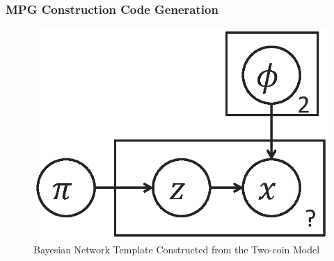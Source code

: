 \subsubsection{MPG Construction Code Generation}
\begin{figure}[h]
\centering
\includegraphics[scale=0.4]{figs/two_coins_bn1.eps}
\caption{Bayesian Network Template Constructed from the Two-coin Model}
\label{fig:two_coins_bn1}
\end{figure}
%
%

